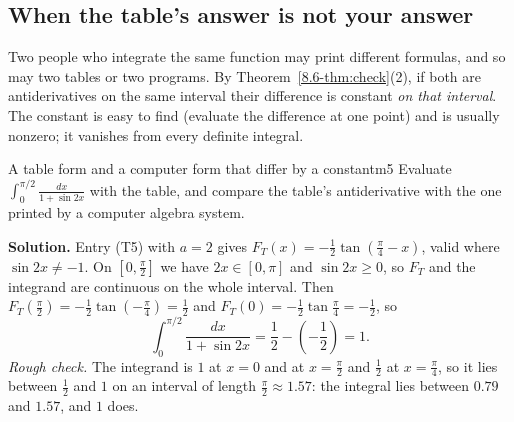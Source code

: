 \documentclass[11pt]{article}
\begin{document}
\subsection*{When the table's answer is not your answer}

Two people who integrate the same function may print different formulas, and so may two tables or two programs. By Theorem~\ref{8.6-thm:check}(2), if both are antiderivatives on the same interval their difference is constant \emph{on that interval}. The constant is easy to find (evaluate the difference at one point) and is usually nonzero; it vanishes from every definite integral.

\begin{exmp}{A table form and a computer form that differ by a constant}{m5}
Evaluate $\displaystyle\int_0^{\pi/2}\frac{dx}{1+\sin2x}$ with the table, and compare the table's antiderivative with the one printed by a computer algebra system.

\textbf{Solution.} Entry (T5) with $a=2$ gives $F_T(x)=-\frac12\tan\left(\frac\pi4-x\right)$, valid where $\sin2x\ne-1$. On $[0,\frac\pi2]$ we have $2x\in[0,\pi]$ and $\sin2x\ge0$, so $F_T$ and the integrand are continuous on the whole interval. Then $F_T\left(\frac\pi2\right)=-\frac12\tan\left(-\frac\pi4\right)=\frac12$ and $F_T(0)=-\frac12\tan\frac\pi4=-\frac12$, so
\[\int_0^{\pi/2}\frac{dx}{1+\sin2x}=\frac12-\left(-\frac12\right)=1 .\]
\emph{Rough check.} The integrand is $1$ at $x=0$ and at $x=\frac\pi2$ and $\frac12$ at $x=\frac\pi4$, so it lies between $\frac12$ and $1$ on an interval of length $\frac\pi2\approx1.57$: the integral lies between $0.79$ and $1.57$, and $1$ does.


\end{exmp}
\end{document}
